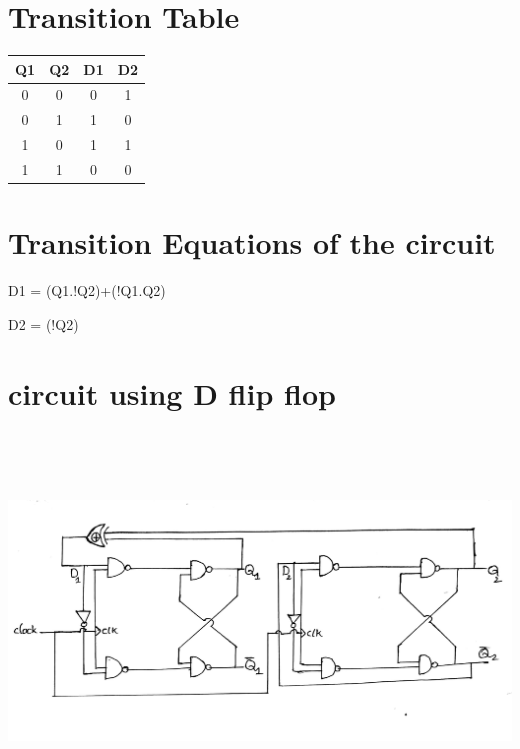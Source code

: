 \documentclass[12pt]{article}
\begin{document}
\section{Transition Table}
\begin{table}[h]
\centering
\begin{tabular}{|c|c|c|c|}
\hline
Q1 & Q2 & D1 & D2\\
\hline
0 & 0 & 0 & 1\\
\hline
0 & 1 & 1 & 0\\
\hline
1 & 0 & 1 & 1\\
\hline
1 & 1 & 0 & 0\\
\hline
\end{tabular}
\end{table}
\section{Transition Equations of the circuit}
D1 = (Q1.!Q2)+(!Q1.Q2)

D2 = (!Q2)
\section{circuit using D flip flop}
\includegraphics[width=15cm,height=10cm]{images/circuitusingdflipflop.jpg}
\end{document}
